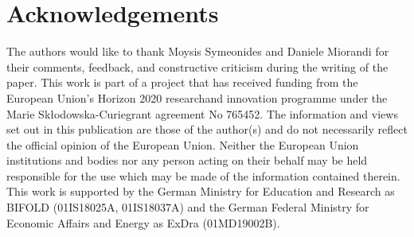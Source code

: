 \section*{Acknowledgements}
\label{sec:acknowledgements}
The authors would like to thank Moysis Symeonides and 
Daniele Miorandi for their comments, feedback, and 
constructive criticism during the writing of the paper.
This work is part of a project that has received funding from the 
European Union’s Horizon 2020 researchand innovation programme under 
the Marie Skłodowska-Curiegrant agreement No 765452. The information 
and views set out in this publication are those of the author(s) 
and do not necessarily reflect the official opinion of the 
European Union. Neither the European Union institutions and bodies 
nor any person acting on their behalf may be held responsible for 
the use which may be made of the information contained therein. This 
work is supported by the German Ministry for Education and 
Research as BIFOLD (01IS18025A, 01IS18037A) and the German Federal 
Ministry for Economic Affairs and Energy as ExDra (01MD19002B).